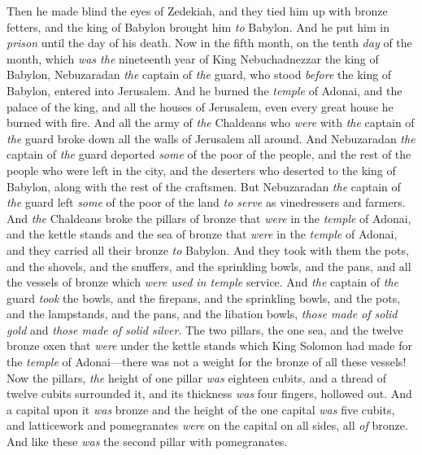 \begin{biblechapter}
\verse Then he made blind the eyes of Zedekiah, and they tied him up with bronze fetters, and the king of Babylon brought him \textit{to} Babylon. And he put him in \textit{prison} until the day of his death.
\verse Now in the fifth month, on the tenth \textit{day} of the month, which \textit{was the} nineteenth year of King Nebuchadnezzar the king of Babylon, Nebuzaradan \textit{the} captain of \textit{the} guard, who stood \textit{before} the king of Babylon, entered into Jerusalem.
\verse And he burned the \textit{temple} of Adonai, and the palace of the king, and all the houses of Jerusalem, even every great house he burned with fire.
\verse And all the army of \textit{the} Chaldeans who \textit{were} with \textit{the} captain of \textit{the} guard broke down all the walls of Jerusalem all around.
\verse And Nebuzaradan \textit{the} captain of \textit{the} guard deported \textit{some} of the poor of the people, and the rest of the people who were left in the city, and the deserters who deserted to the king of Babylon, along with the rest of the craftsmen.
\verse But Nebuzaradan \textit{the} captain of \textit{the} guard left \textit{some} of the poor of the land \textit{to serve} as vinedressers and farmers.
\verse And \textit{the} Chaldeans broke the pillars of bronze that \textit{were} in the \textit{temple} of Adonai, and the kettle stands and the sea of bronze that \textit{were} in the \textit{temple} of Adonai, and they carried all their bronze \textit{to} Babylon.
\verse And they took with them the pots, and the shovels, and the snuffers, and the sprinkling bowls, and the pans, and all the vessels of bronze which \textit{were used in temple} service.
\verse And \textit{the} captain of \textit{the} guard \textit{took} the bowls, and the firepans, and the sprinkling bowls, and the pots, and the lampstands, and the pans, and the libation bowls, \textit{those made of solid gold} and \textit{those made of solid silver}.
\verse The two pillars, the one sea, and the twelve bronze oxen that \textit{were} under the kettle stands which King Solomon had made for the \textit{temple} of Adonai—there was not a weight for the bronze of all these vessels!
\verse Now the pillars, \textit{the} height of one pillar \textit{was} eighteen cubits, and a thread of twelve cubits surrounded it, and its thickness \textit{was} four fingers, hollowed out.
\verse And a capital upon it \textit{was} bronze and the height of the one capital \textit{was} five cubits, and latticework and pomegranates \textit{were} on the capital on all sides, all \textit{of} bronze. And like these \textit{was} the second pillar with pomegranates.

\end{biblechapter}
